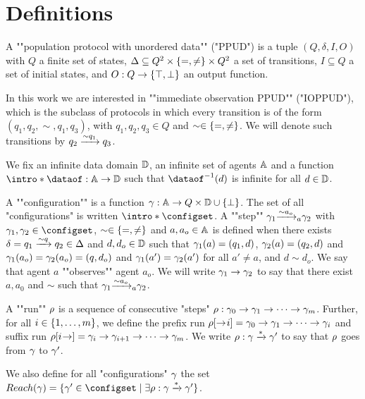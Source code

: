 \section{Definitions}
\label{sec:definitions}


\begin{definition}
	A ""population protocol with unordered data"" ("PPUD") is a tuple $(Q, \delta, I, O)$ with $Q$ a finite set of states,
	$\Delta \subseteq Q^2 \times \set{=, \neq} \times Q^2$ a set of transitions,
	$I \subseteq Q$ a set of initial states, and
	$O : Q \to \set{\top, \bot}$ an output function.
	
	In this work we are interested in ""immediate observation PPUD"" ("IOPPUD"), which is the subclass of protocols in which every transition is of the form $(q_1, q_2, \sim, q_1, q_3)$, with $q_1, q_2, q_3 \in Q$ and $\sim \in \set{=, \neq}$.
	We will denote such transitions by $q_2 \trans{q_1}{\sim} q_3$.
\end{definition}

We fix an infinite data domain $\Dataset$, an infinite set of agents $\Agentset$ and a function $\intro*\dataof : \Agentset \to \Dataset$ such that $\dataof^{-1}(d)$ is infinite for all $d \in \Dataset$. 

A ""configuration"" is a function $\config : \Agentset \to Q \times \Dataset \cup \set{\bot}$. The set of all "configurations" is written $\intro*\configset$.
A ""step"" $\config_1 \step{\sim}{a}{a_o} \config_2$ with $\config_1, \config_2 \in \configset$, $\sim \in \set{=, \neq}$ and $a, a_o \in \Agentset$ is defined when there exists  $\delta = q_1 \trans{q}{\sim} q_2 \in \Delta$ and $d, d_o \in \Dataset$ such that $\config_1(a) = (q_1, d)$, $\config_2(a) = (q_2, d)$ and $\config_1(a_o) = \config_2(a_o) = (q, d_o)$ and $\config_1(a') = \config_2(a')$ for all $a' \neq a$, and $d \sim d_o$.
We say that agent $a$ ""observes"" agent $a_o$. 
We will write $\config_1 \to \config_2$ to say that there exist $a, a_0$ and $\sim$ such that $\config_1 \step{\sim}{a}{a_o} \config_2$.

A ""run"" $\run$ is a sequence of consecutive "steps" $\run: \config_0 \to \config_1 \to \cdots \to  \config_m$.
Further, for all $i \in \nset{1}{m}$, we define the prefix run $\prefixrun{\run}{i} = \config_0 \to \config_1 \to \cdots \to  \config_i$ and suffix run $\suffixrun{\run}{i} = \config_i \to \config_{i+1} \to \cdots \to  \config_m$. We write $\run : \config \xrightarrow{*} \config'$ to say that $\run$ goes from $\config$ to $\config'$. 

We also define for all "configurations" $\config$ the set $\Reach(\config) = \set{\config' \in \configset \mid \exists \run : \config \xrightarrow{*} \config'}$.